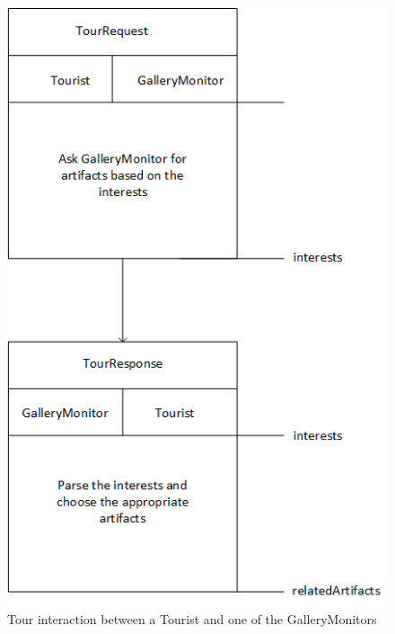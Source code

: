 \documentclass[a4paper, 11pt]{article}
\begin{document}
\begin{figure}[H]
	\caption{Tour interaction between a Tourist and one of the GalleryMonitors}
	\centering
	\includegraphics[scale=0.8]{./images/interaction-tourguide.png}
\end{figure}
\end{document}
